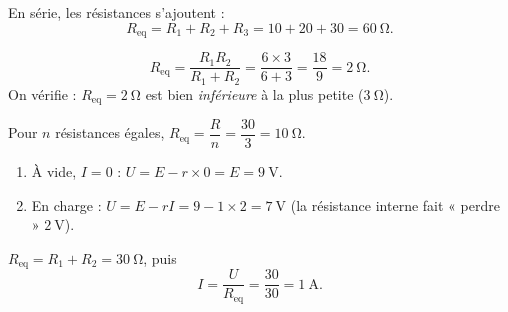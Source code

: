 \documentclass[11pt,a4paper]{article}
\begin{document}
\usetikzlibrary{babel}
\begin{corrige}
En série, les résistances s'ajoutent :
\[ R_{\text{eq}}=R_1+R_2+R_3=10+20+30=\qty{60}{\ohm}. \]
\end{corrige}

\begin{corrige}
\[ R_{\text{eq}}=\frac{R_1 R_2}{R_1+R_2}=\frac{6\times3}{6+3}=\frac{18}{9}=\qty{2}{\ohm}. \]
On vérifie : $R_{\text{eq}}=\qty{2}{\ohm}$ est bien \emph{inférieure} à la plus petite ($\qty{3}{\ohm}$).
\end{corrige}

\begin{corrige}
Pour $n$ résistances égales, $R_{\text{eq}}=\dfrac{R}{n}=\dfrac{30}{3}=\qty{10}{\ohm}$.
\end{corrige}

\begin{corrige}
\begin{enumerate}[label=\alph*)]
  \item À vide, $I=0$ : $U=E-r\times0=E=\qty{9}{\volt}$.
  \item En charge : $U=E-rI=9-1\times2=\qty{7}{\volt}$ (la résistance interne fait « perdre »
        $\qty{2}{\volt}$).
\end{enumerate}
\end{corrige}

\begin{corrige}
$R_{\text{eq}}=R_1+R_2=\qty{30}{\ohm}$, puis
\[ I=\frac{U}{R_{\text{eq}}}=\frac{30}{30}=\qty{1}{\ampere}. \]
\end{corrige}
\end{document}
